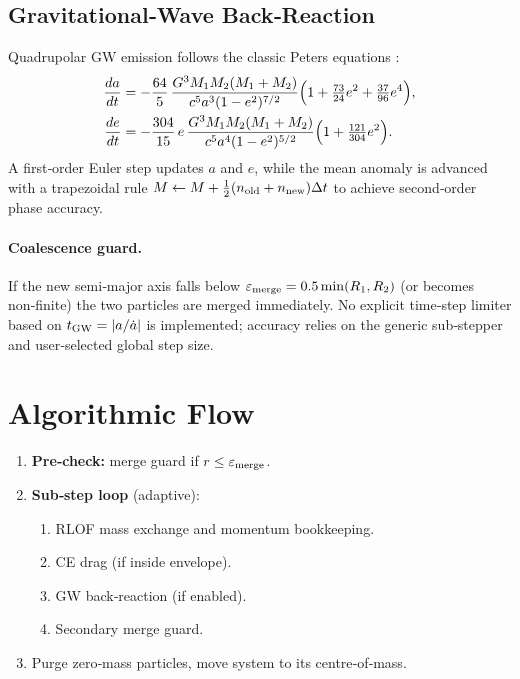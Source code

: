 \documentclass[11pt]{article}
\begin{document}
\subsection{Gravitational‑Wave Back‑Reaction}
\label{sec:gw}

Quadrupolar GW emission follows the classic Peters equations
\citep{Peters1964}:
\begin{align}
\frac{da}{dt} &=
-\frac{64}{5}\,\frac{G^3M_1M_2(M_1+M_2)}{c^5a^3(1-e^2)^{7/2}}
\Bigl(1+\tfrac{73}{24}e^2+\tfrac{37}{96}e^4\Bigr),
\label{eq:da_dt}\\
\frac{de}{dt} &=
-\frac{304}{15}\,e\,\frac{G^3M_1M_2(M_1+M_2)}{c^5a^4(1-e^2)^{5/2}}
\Bigl(1+\tfrac{121}{304}e^2\Bigr).
\label{eq:de_dt}
\end{align}
A first‑order Euler step updates $a$ and $e$, while the mean anomaly is
advanced with a trapezoidal rule
\(
M\gets M+\tfrac12(n_{\rm old}+n_{\rm new})\Delta t
\)
to achieve second‑order phase accuracy.

\paragraph{Coalescence guard.}
If the new semi‑major axis falls below
$\varepsilon_{\rm merge}=0.5\min(R_1,R_2)$
(or becomes non‑finite) the two particles are merged immediately.
No explicit time‑step limiter based on $t_{\rm GW}=|a/\dot a|$ is
implemented; accuracy relies on the generic sub‑stepper and
user‑selected global step size.

\section{Algorithmic Flow}

\begin{enumerate}[nosep]
\item \textbf{Pre‑check:} merge guard if $r\le\varepsilon_{\rm merge}$.
\item \textbf{Sub‑step loop} (adaptive):
  \begin{enumerate}[nosep]
    \item RLOF mass exchange and momentum bookkeeping.
    \item CE drag (if inside envelope).
    \item GW back‑reaction (if enabled).
    \item Secondary merge guard.
  \end{enumerate}
\item Purge zero‑mass particles, move system to its centre‑of‑mass.
\end{enumerate}
\end{document}
